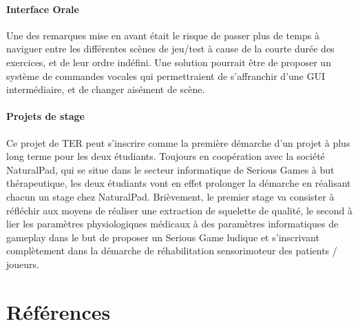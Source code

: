 \documentclass[french,12pt]{report}
\begin{document}
\paragraph{Interface Orale}
Une des remarques mise en avant était le risque de passer plus de temps à naviguer entre les différentes scènes de jeu/test à cause de la courte durée des exercices, et de leur ordre indéfini. Une solution pourrait être de proposer un système de 
commandes vocales qui permettraient de s'affranchir d'une GUI intermédiaire, et de changer aisément de scène.

\paragraph{Projets de stage} %
Ce projet de TER peut s'inscrire comme la première démarche d'un projet à plus long terme pour les deux étudiants. Toujours
en coopération avec la société NaturalPad, qui se situe dans le secteur informatique de Serious Games à but 
thérapeutique, les deux étudiants vont en effet prolonger la démarche en réalisant chacun un stage chez NaturalPad. Brièvement,
le premier stage va consister à réfléchir aux moyens de réaliser une extraction de squelette de qualité, le second à lier les
paramètres physiologiques médicaux à des paramètres informatiques de gameplay dans le but de proposer un Serious Game
ludique et s'inscrivant complètement dans la démarche de réhabilitation sensorimoteur des patients / joueurs.	

   \newpage
    \section{Références}
    
    
\end{document}
